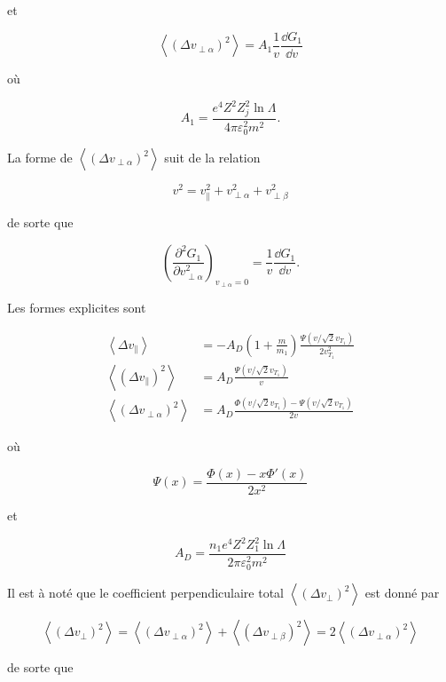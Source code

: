 \documentclass[main.tex]{subfiles}
\begin{document}
\noindent et

\[
	\left\langle \left( \Delta v_{\perp\alpha} \right)^2 \right\rangle = A_1 \frac{1}{v} \frac{\dd G_1}{\dd v} 
\]

\noindent où

\[
	A_1 = \frac{e^4 Z^2 Z^2_j \ln \Lambda}{4 \pi \varepsilon_0^2 m^2}.
\]

\noindent La forme de \( \left\langle \left( \Delta v_{\perp\alpha} \right)^2 \right\rangle  \) suit de la relation

\[
	v^2 = v_\parallel^2 + v_{\perp \alpha}^2 + v_{\perp \beta}^2
\]

\noindent de sorte que

\[
	\left( \frac{\partial^2 G_1}{\partial v_{\perp\alpha}^2} \right)_{v_{\perp\alpha} = 0} = \frac{1}{v} \frac{\dd G_1}{\dd v}.
\]

\noindent Les formes explicites sont

\begin{align}
	\left\langle \Delta v_\parallel \right\rangle &= - A_D \left(1 + \frac{m}{m_1} \right) \frac{\Psi \left( v / \sqrt{2} v_{T_1}\right)}{2v_{T_1}^2}
	\label{eq:Delta_v_parallel}\\
	\left\langle \left( \Delta v_\parallel \right)^2 \right\rangle &= A_D \frac{\Psi \left( v / \sqrt{2}v_{T_1} \right)}{v} \nonumber\\
	\left\langle \left(\Delta v_{\perp\alpha} \right)^2 \right\rangle &= A_D \frac{\Phi \left(v/\sqrt{2} v_{T_1}\right) - \Psi \left(v/\sqrt{2} v_{T_1}\right)}{2v}
	\label{eq:Delta_v_perp}
\end{align}

\noindent où

\[
	\Psi\left( x \right) = \frac{\Phi \left( x \right) - x \Phi'\left( x \right) }{2x^2}
\]

\noindent et

\[
	A_D = \frac{n_1 e^4 Z^2 Z_1^2 \ln \Lambda}{2 \pi \varepsilon_0^2 m^2}
\]

\noindent Il est à noté que le coefficient perpendiculaire total \( \left\langle \left( \Delta v_\perp \right)^2 \right\rangle \) est donné par

\[
	\left\langle \left( \Delta v_\perp \right)^2 \right\rangle = \left\langle \left( \Delta v_{\perp \alpha} \right)^2 \right\rangle + \left\langle \left( \Delta v_{\perp \beta} \right)^2 \right\rangle = 2 \left\langle \left( \Delta v_{\perp \alpha} \right)^2 \right\rangle
\]

\noindent de sorte que
\end{document}
